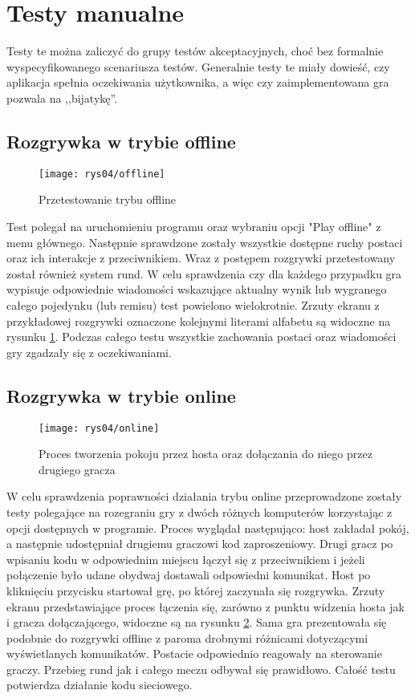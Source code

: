 \section{Testy manualne}
Testy te można zaliczyć do grupy testów akceptacyjnych, choć bez formalnie wyspecyfikowanego scenariusza testów. Generalnie testy te miały dowieść, czy aplikacja spełnia oczekiwania użytkownika, a więc czy zaimplementowana gra pozwala na ,,bijatykę''.
\subsection{Rozgrywka w trybie offline}
\begin{figure}[htb]
	\centering
		\texttt{[image: rys04/offline]}
	\caption{Przetestowanie trybu offline}
	\label{fig:offline}
\end{figure}
Test polegał na uruchomieniu programu oraz wybraniu opcji "Play offline" z menu głównego. Następnie sprawdzone zostały wszystkie dostępne ruchy postaci oraz ich interakcje z przeciwnikiem. Wraz z postępem rozgrywki przetestowany został również system rund. W celu sprawdzenia czy dla każdego przypadku gra wypisuje odpowiednie wiadomości wskazujące aktualny wynik lub wygranego całego pojedynku (lub remisu) test powielono wielokrotnie. Zrzuty ekranu z przykładowej rozgrywki oznaczone kolejnymi literami alfabetu są widoczne na rysunku \ref{fig:offline}. Podczas całego testu wszystkie zachowania postaci oraz wiadomości gry zgadzały się z oczekiwaniami.

\subsection{Rozgrywka w trybie online}
\begin{figure}[htb]
	\centering
		\texttt{[image: rys04/online]}
	\caption{Proces tworzenia pokoju przez hosta oraz dołączania do niego przez drugiego gracza}
	\label{fig:online}
\end{figure}
W celu sprawdzenia poprawności działania trybu online przeprowadzone zostały testy polegające na rozegraniu gry z dwóch różnych komputerów korzystając z opcji dostępnych w programie. Proces wyglądał następująco: host zakładał pokój, a następnie udostępniał drugiemu graczowi kod zaproszeniowy. Drugi gracz po wpisaniu kodu w odpowiednim miejscu łączył się z przeciwnikiem i jeżeli połączenie było udane obydwaj dostawali odpowiedni komunikat. Host po kliknięciu przycisku startował grę, po której zaczynała się rozgrywka. Zrzuty ekranu przedstawiające proces łączenia się, zarówno z punktu widzenia hosta jak i gracza dołączającego, widoczne są na rysunku \ref{fig:online}. Sama gra prezentowała się podobnie do rozgrywki offline z paroma drobnymi różnicami dotyczącymi wyświetlanych komunikatów. Postacie odpowiednio reagowały na sterowanie graczy. Przebieg rund jak i całego meczu odbywał się prawidłowo. Całość testu potwierdza działanie kodu sieciowego.

